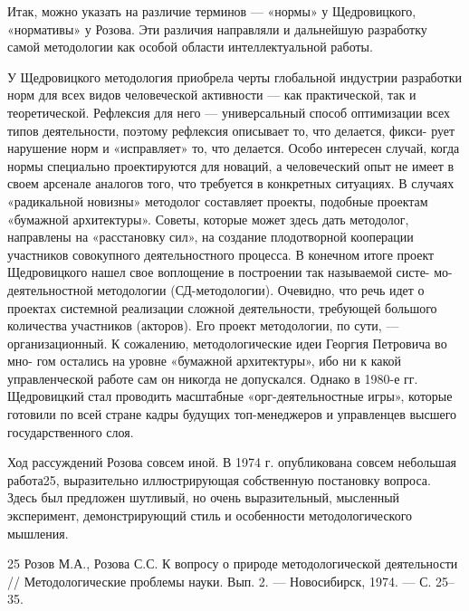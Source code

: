 \documentclass[11pt,a4paper]{article}
\begin{document}
Итак, можно указать на различие терминов — «нормы» у Щедровицкого, «нормативы»
у Розова. Эти различия направляли и дальнейшую разработку самой методологии
как особой области интеллектуальной работы.

У Щедровицкого методология приобрела черты глобальной индустрии разработки
норм для всех видов человеческой активности — как практической, так и
теоретической. Рефлексия для него — универсальный способ оптимизации всех
типов деятельности, поэтому рефлексия описывает то, что делается, фикси-
рует нарушение норм и «исправляет» то, что делается. Особо интересен случай,
когда нормы специально проектируются для новаций, а человеческий опыт не имеет
в своем арсенале аналогов того, что требуется в конкретных ситуациях. В
случаях «радикальной новизны» методолог составляет проекты, подобные
проектам «бумажной архитектуры». Советы, которые может здесь дать методолог,
направлены на «расстановку сил», на создание плодотворной кооперации
участников совокупного деятельностного процесса. В конечном итоге проект
Щедровицкого нашел свое воплощение в построении так называемой систе-
мо-деятельностной методологии (СД-методологии). Очевидно, что речь идет о
проектах системной реализации сложной деятельности, требующей большого
количества участников (акторов). Его проект методологии, по сути, —
организационный. К сожалению, методологические идеи Георгия Петровича во мно-
гом остались на уровне «бумажной архитектуры», ибо ни к какой управленческой
работе сам он никогда не допускался. Однако в 1980-е гг. Щедровицкий стал
проводить масштабные «орг-деятельностные игры», которые готовили по всей
стране кадры будущих топ-менеджеров и управленцев высшего государственного
слоя.

Ход рассуждений Розова совсем иной. В 1974 г. опубликована совсем небольшая
работа25, выразительно иллюстрирующая собственную постановку вопроса. Здесь
был предложен шутливый, но очень выразительный, мысленный эксперимент,
демонстрирующий стиль и особенности методологического мышления.

25 Розов М.А., Розова С.С. К вопросу о природе методологической деятельности
// Методологические проблемы науки. Вып. 2. — Новосибирск, 1974. — С. 25–35.
\end{document}
